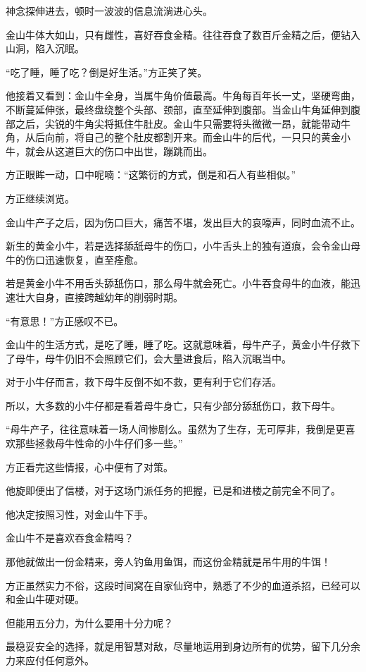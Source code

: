 \begin{this_body}
神念探伸进去，顿时一波波的信息流淌进心头。

金山牛体大如山，只有雌性，喜好吞食金精。往往吞食了数百斤金精之后，便钻入山洞，陷入沉眠。

“吃了睡，睡了吃？倒是好生活。”方正笑了笑。

他接着又看到：金山牛全身，当属牛角价值最高。牛角每百年长一丈，坚硬弯曲，不断蔓延伸张，最终盘绕整个头部、颈部，直至延伸到腹部。当金山牛角延伸到腹部之后，尖锐的牛角尖将抵住牛肚皮。金山牛只需要将头微微一昂，就能带动牛角，从后向前，将自己的整个肚皮都割开来。而金山牛的后代，一只只的黄金小牛，就会从这道巨大的伤口中出世，蹦跳而出。

方正眼眸一动，口中呢喃：“这繁衍的方式，倒是和石人有些相似。”

方正继续浏览。

金山牛产子之后，因为伤口巨大，痛苦不堪，发出巨大的哀嚎声，同时血流不止。

新生的黄金小牛，若是选择舔舐母牛的伤口，小牛舌头上的独有道痕，会令金山母牛的伤口迅速恢复，直至痊愈。

若是黄金小牛不用舌头舔舐伤口，那么母牛就会死亡。小牛吞食母牛的血液，能迅速壮大自身，直接跨越幼年的削弱时期。

“有意思！”方正感叹不已。

金山牛的生活方式，是吃了睡，睡了吃。这就意味着，母牛产子，黄金小牛仔救下了母牛，母牛仍旧不会照顾它们，会大量进食后，陷入沉眠当中。

对于小牛仔而言，救下母牛反倒不如不救，更有利于它们存活。

所以，大多数的小牛仔都是看着母牛身亡，只有少部分舔舐伤口，救下母牛。

“母牛产子，往往意味着一场人间惨剧么。虽然为了生存，无可厚非，我倒是更喜欢那些拯救母牛性命的小牛仔们多一些。”

方正看完这些情报，心中便有了对策。

他旋即便出了信楼，对于这场门派任务的把握，已是和进楼之前完全不同了。

他决定按照习性，对金山牛下手。

金山牛不是喜欢吞食金精吗？

那他就做出一份金精来，旁人钓鱼用鱼饵，而这份金精就是吊牛用的牛饵！

方正虽然实力不俗，这段时间窝在自家仙窍中，熟悉了不少的血道杀招，已经可以和金山牛硬对硬。

但能用五分力，为什么要用十分力呢？

最稳妥安全的选择，就是用智慧对敌，尽量地运用到身边所有的优势，留下几分余力来应付任何意外。


\end{this_body}
